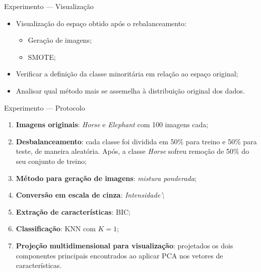 \documentclass[10pt]{beamer}
\begin{document}
%
\begin{frame}{Experimento --- Visualização}
  \setlength\leftmargini{1em}
  \begin{itemize}
  \item Visualização do espaço obtido após o rebalanceamento:
    \begin{itemize}
      \item Geração de imagens;
      \item SMOTE;
    \end{itemize}
  \item Verificar a definição da classe minoritária em relação ao espaço original;
  \item Analisar qual método mais se assemelha à distribuição original dos dados.
  \end{itemize}
\end{frame}
\begin{frame}{Experimento --- Protocolo}
  \setlength\leftmargini{1em}
  \begin{block}{}
        \begin{enumerate}
    \item \textbf{Imagens originais}: \emph{Horse} e \emph{Elephant} com 100 imagens cada;
    \item \textbf{Desbalanceamento}: cada classe foi dividida em 50\% para treino e 50\% para teste, de maneira aleatória. Após, a classe \emph{Horse} sofreu remoção de 50\% do seu conjunto de treino;
    \item \textbf{Método para geração de imagens}: \emph{mistura ponderada};
    \item \textbf{Conversão em escala de cinza}: \emph{Intensidade'};
    \item \textbf{Extração de características}: BIC;
    \item \textbf{Classificação}: KNN com $K=1$;
    \item \textbf{Projeção multidimensional para visualização}: projetados os dois componentes principais encontrados ao aplicar PCA nos vetores de características.
    \end{enumerate}
  \end{block}
\end{frame}
\end{document}
